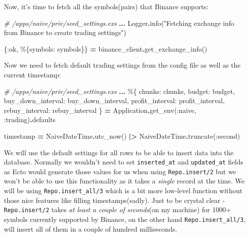 \documentclass[
  oneside]{book}
\newenvironment{Shaded}{\begin{snugshade}}{\end{snugshade}}
\newcommand{\CommentTok}[1]{\textcolor[rgb]{0.56,0.35,0.01}{\textit{#1}}}
\newcommand{\ConstantTok}[1]{\textcolor[rgb]{0.00,0.00,0.00}{#1}}
\newcommand{\NormalTok}[1]{#1}
\newcommand{\OperatorTok}[1]{\textcolor[rgb]{0.81,0.36,0.00}{\textbf{#1}}}
\newcommand{\StringTok}[1]{\textcolor[rgb]{0.31,0.60,0.02}{#1}}
\newcommand{\VariableTok}[1]{\textcolor[rgb]{0.00,0.00,0.00}{#1}}
\begin{document}
Now, it's time to fetch all the symbols(pairs) that Binance supports:

\begin{Shaded}
\begin{Highlighting}[]
\CommentTok{\# /apps/naive/priv/seed\_settings.exs}
\OperatorTok{...}
\ConstantTok{Logger}\OperatorTok{.}\NormalTok{info(}\StringTok{"Fetching exchange info from Binance to create trading settings"}\NormalTok{)}

\NormalTok{\{}\VariableTok{:ok}\NormalTok{, \%\{}\VariableTok{symbols:}\NormalTok{ symbols\}\} }\OperatorTok{=}\NormalTok{ binance\_client}\OperatorTok{.}\NormalTok{get\_exchange\_info()}
\end{Highlighting}
\end{Shaded}

Now we need to fetch default trading settings from the config file as well as the current timestamp:

\begin{Shaded}
\begin{Highlighting}[]
\CommentTok{\# /apps/naive/priv/seed\_settings.exs}
\OperatorTok{...}
\NormalTok{\%\{}
  \VariableTok{chunks:}\NormalTok{ chunks,}
  \VariableTok{budget:}\NormalTok{ budget,}
  \VariableTok{buy\_down\_interval:}\NormalTok{ buy\_down\_interval,}
  \VariableTok{profit\_interval:}\NormalTok{ profit\_interval,}
  \VariableTok{rebuy\_interval:}\NormalTok{ rebuy\_interval}
\NormalTok{\} }\OperatorTok{=} \ConstantTok{Application}\OperatorTok{.}\NormalTok{get\_env(}\VariableTok{:naive}\NormalTok{, }\VariableTok{:trading}\NormalTok{)}\OperatorTok{.}\NormalTok{defaults}

\NormalTok{timestamp }\OperatorTok{=} \ConstantTok{NaiveDateTime}\OperatorTok{.}\NormalTok{utc\_now()}
  \OperatorTok{|\textgreater{}} \ConstantTok{NaiveDateTime}\OperatorTok{.}\NormalTok{truncate(}\VariableTok{:second}\NormalTok{)}
\end{Highlighting}
\end{Shaded}

We will use the default settings for all rows to be able to insert data into the database. Normally we wouldn't need to set \texttt{inserted\_at} and \texttt{updated\_at} fields as Ecto would generate those values for us when using \texttt{Repo.insert/2} but we won't be able to use this functionality as it takes a \emph{single} record at the time. We will be using \texttt{Repo.insert\_all/3} which is a bit more low-level function without those nice features like filling timestamps(sadly). Just to be crystal clear - \texttt{Repo.insert/2} takes \emph{at least a couple of seconds}(on my machine) for 1000+ symbols currently supported by Binance, on the other hand \texttt{Repo.insert\_all/3}, will insert all of them in a couple of hundred milliseconds.
\end{document}
